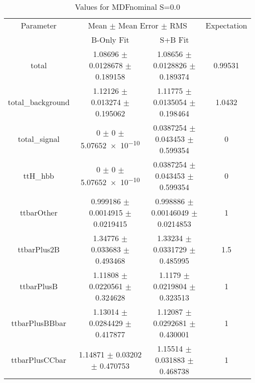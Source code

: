 \begin{table}
\centering
\caption{Values for MDFnominal S=0.0}
\begin{tabular}{cccc}
\toprule
Parameter & \multicolumn{2}{c}{Mean $\pm$ Mean Error $\pm$ RMS} & Expectation\\
 & B-Only Fit & S+B Fit & \\
\midrule
total & \num{1.08696} $\pm$ \num{0.0128678} $\pm$ \num{0.189158} & \num{1.08656} $\pm$ \num{0.0128826} $\pm$ \num{0.189374} & \num{0.99531}\\
total\_background & \num{1.12126} $\pm$ \num{0.013274} $\pm$ \num{0.195062} & \num{1.11775} $\pm$ \num{0.0135054} $\pm$ \num{0.198464} & \num{1.0432}\\
total\_signal & \num{0} $\pm$ \num{0} $\pm$ \num{5.07652e-10} & \num{0.0387254} $\pm$ \num{0.043453} $\pm$ \num{0.599354} & \num{0}\\
ttH\_hbb & \num{0} $\pm$ \num{0} $\pm$ \num{5.07652e-10} & \num{0.0387254} $\pm$ \num{0.043453} $\pm$ \num{0.599354} & \num{0}\\
ttbarOther & \num{0.999186} $\pm$ \num{0.0014915} $\pm$ \num{0.0219415} & \num{0.998886} $\pm$ \num{0.00146049} $\pm$ \num{0.0214853} & \num{1}\\
ttbarPlus2B & \num{1.34776} $\pm$ \num{0.033683} $\pm$ \num{0.493468} & \num{1.33234} $\pm$ \num{0.0331729} $\pm$ \num{0.485995} & \num{1.5}\\
ttbarPlusB & \num{1.11808} $\pm$ \num{0.0220561} $\pm$ \num{0.324628} & \num{1.1179} $\pm$ \num{0.0219804} $\pm$ \num{0.323513} & \num{1}\\
ttbarPlusBBbar & \num{1.13014} $\pm$ \num{0.0284429} $\pm$ \num{0.417877} & \num{1.12087} $\pm$ \num{0.0292681} $\pm$ \num{0.430001} & \num{1}\\
ttbarPlusCCbar & \num{1.14871} $\pm$ \num{0.03202} $\pm$ \num{0.470753} & \num{1.15514} $\pm$ \num{0.031883} $\pm$ \num{0.468738} & \num{1}\\
\bottomrule
\end{tabular}
\end{table}
